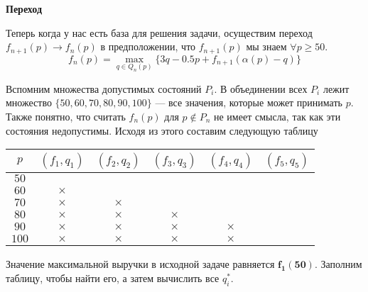 \bigskip

\textbf{Переход}

Теперь когда у нас есть база для решения задачи, осуществим переход $f_{n+1}(p) \to f_n(p)$ в предположении, что $f_{n+1}(p)$ мы знаем $\forall p \ge 50$.
\[
\boxed{f_n(p) = \max_{q \in Q_n(p)} \Big\{3q - 0.5p + f_{n + 1}(\alpha(p) - q)\Big\}}\tag{**}
\]

Вспомним множества допустимых состояний $P_i$. В объединении всех $P_i$ лежит множество $\{50, 60, 70, 80, 90, 100\}$ --- все значения, которые может принимать $p$. Также понятно, что считать $f_n(p)$ для $p \notin P_n$ не имеет смысла, так как эти состояния недопустимы. Исходя из этого составим следующую таблицу

\begin{table}[H]
	\centering
	\begin{tabular}{ | c | c | c | c | c | c | } 
		\hline
		$p$ & $(f_1, q_1)$ & $(f_2, q_2)$ & $(f_3, q_3)$ & $(f_4, q_4)$ & $(f_5, q_5)$ \\ 
		\hline
		$50$ & & & & & \\\hline
		$60$ & $\times$ & & & & \\\hline
		$70$ & $\times$ & $\times$ & & & \\\hline
		$80$ & $\times$ & $\times$ & $\times$ & & \\\hline
		$90$ & $\times$ & $\times$ & $\times$ & $\times$ & \\\hline
		$100$ & $\times$ & $\times$ & $\times$ & $\times$ & \\\hline
	\end{tabular}
\end{table}

Значение максимальной выручки в исходной задаче равняется $\mathbf {f_1(50)}$. Заполним таблицу, чтобы найти его, а затем вычислить все $q^*_i$.

\bigskip

